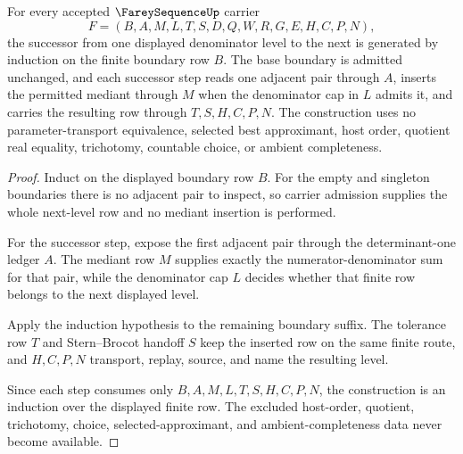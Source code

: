\begin{theorem}
\label{thm:farey-sequence-level-successor-induction}
For every accepted $\FareySequenceUp$ carrier
$$
F=(B,A,M,L,T,S,D,Q,W,R,G,E,H,C,P,N),
$$
the successor from one displayed denominator level to the next is generated by induction on the finite boundary row $B$. The base boundary is admitted unchanged, and each successor step reads one adjacent pair through $A$, inserts the permitted mediant through $M$ when the denominator cap in $L$ admits it, and carries the resulting row through $T,S,H,C,P,N$. The construction uses no parameter-transport equivalence, selected best approximant, host order, quotient real equality, trichotomy, countable choice, or ambient completeness.
\end{theorem}
\begin{proof}
Induct on the displayed boundary row $B$. For the empty and singleton boundaries there is no adjacent pair to inspect, so carrier admission supplies the whole next-level row and no mediant insertion is performed.

For the successor step, expose the first adjacent pair through the determinant-one ledger $A$. The mediant row $M$ supplies exactly the numerator-denominator sum for that pair, while the denominator cap $L$ decides whether that finite row belongs to the next displayed level.

Apply the induction hypothesis to the remaining boundary suffix. The tolerance row $T$ and Stern--Brocot handoff $S$ keep the inserted row on the same finite route, and $H,C,P,N$ transport, replay, source, and name the resulting level.

Since each step consumes only $B,A,M,L,T,S,H,C,P,N$, the construction is an induction over the displayed finite row. The excluded host-order, quotient, trichotomy, choice, selected-approximant, and ambient-completeness data never become available.
\end{proof}

